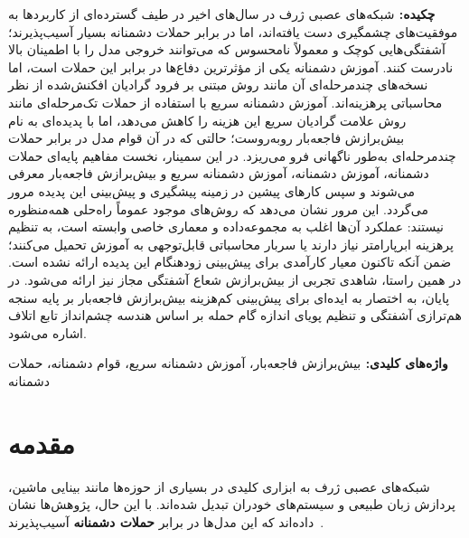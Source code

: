 \documentclass[11pt]{article}
\begin{document}
{\bf {چکيده: }}
شبکه‌های عصبی ژرف در سال‌های اخیر در طیف گسترده‌ای از کاربردها به موفقیت‌های چشمگیری دست یافته‌اند،
اما در برابر حملات دشمنانه بسیار آسیب‌پذیرند؛
آشفتگی‌هایی کوچک و معمولاً نامحسوس که می‌توانند خروجی مدل را با اطمینان بالا نادرست کنند.
آموزش دشمنانه یکی از مؤثرترین دفاع‌ها در برابر این حملات است،
اما نسخه‌های چندمرحله‌ای آن مانند روش مبتنی بر فرود گرادیان افکنش‌شده
از نظر محاسباتی پرهزینه‌اند.
آموزش دشمنانه سریع با استفاده از حملات تک‌مرحله‌ای مانند
روش علامت گرادیان سریع این هزینه را کاهش می‌دهد،
اما با پدیده‌ای به نام بیش‌برازش فاجعه‌بار روبه‌روست؛
حالتی که در آن قوام مدل در برابر حملات چندمرحله‌ای به‌طور ناگهانی فرو می‌ریزد.
در این سمینار، نخست مفاهیم پایه‌ای حملات دشمنانه، آموزش دشمنانه، آموزش دشمنانه سریع و بیش‌برازش فاجعه‌بار معرفی می‌شوند
و سپس کارهای پیشین در زمینه‌ پیشگیری و پیش‌بینی این پدیده مرور می‌گردد.
این مرور نشان می‌دهد که روش‌های موجود عموماً راه‌حلی همه‌منظوره نیستند:
عملکرد آن‌ها اغلب به مجموعه‌داده و معماری خاصی وابسته است، به تنظیم پرهزینه‌ ابرپارامتر نیاز دارند
یا سربار محاسباتی قابل‌توجهی به آموزش تحمیل می‌کنند؛
ضمن آنکه تاکنون معیار کارآمدی برای پیش‌بینی زودهنگام این پدیده ارائه نشده است.
در همین راستا، شاهدی تجربی از بیش‌برازش شعاع آشفتگی مجاز نیز ارائه می‌شود.
در پایان، به اختصار به ایده‌ای برای پیش‌بینی کم‌هزینه‌ بیش‌برازش فاجعه‌بار بر پایه‌ سنجه‌ هم‌ترازی آشفتگی
و تنظیم پویای اندازه‌ گام حمله بر اساس هندسه‌ چشم‌انداز تابع اتلاف اشاره می‌شود.



{\bf  { واژه‌های کلیدی: }}
بیش‌برازش فاجعه‌بار، آموزش دشمنانه سریع، قوام دشمنانه، حملات دشمنانه

\setlength{\parindent}{0.25in} %

\section{مقدمه}\label{intro}

شبکه‌های عصبی ژرف به ابزاری کلیدی در بسیاری از حوزه‌ها مانند بینایی ماشین،
پردازش زبان طبیعی و سیستم‌های خودران تبدیل شده‌اند.
با این حال، پژوهش‌ها نشان داده‌اند که این مدل‌ها در برابر \textbf{حملات دشمنانه} آسیب‌پذیرند~\cite{szegedy2014intriguing}.
\end{document}
